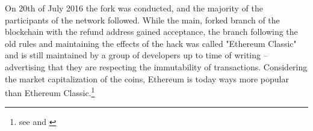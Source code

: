 On 20th of July 2016 the fork was conducted, and the majority of the participants of the network followed. While the main, forked branch of the blockchain with the refund address gained acceptance, the branch following the old rules and maintaining the effects of the hack was called "Ethereum Classic" and is still maintained by a group of developers up to time of writing -- advertising that they are respecting the immutability of transactions. Considering the market capitalization of the coins, Ethereum is today ways more popular than Ethereum Classic.\footnote{see \cite{heise:fork} and \cite{ethereumclassic:titlepage}}
